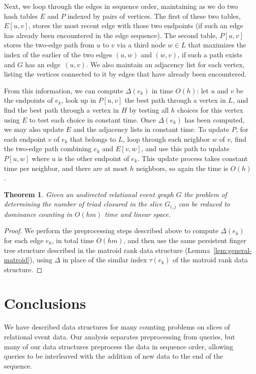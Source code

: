 \documentclass[11pt]{article}
\newtheorem{theorem}{Theorem}
\begin{document}
Next, we loop through the edges in sequence order, maintaining as we do two hash tables $E$ and $P$ indexed by pairs of vertices. The first of these two tables, $E[u,v]$, stores the most recent edge with those two endpoints (if such an edge has already been encountered in the edge sequence). The second table, $P[u,v]$ stores the two-edge path from $u$ to $v$ via a third node $w\in L$ that maximizes the index of the earlier of the two edges $(u,w)$ and $(w,v)$, if  such a path exists and $G$ has an edge~$(u,v)$. We also maintain an adjacency list for each vertex, listing the vertices connected to it by edges that have already been encountered.

From this information, we can compute $\Delta(e_k)$ in time $O(h)$: let $u$ and $v$ be the endpoints of $e_k$, look up in $P[u,v]$ the best path through a vertex in $L$, and find the best path through a vertex in $H$ by testing all $h$ choices for this vertex using $E$ to test each choice in constant time. Once $\Delta(e_k)$ has been computed, we may also update $E$ and the adjacency lists in constant time. To update $P$, for each endpoint $v$ of $e_k$ that belongs to $L$, loop through each neighbor $w$ of $v$, find the two-edge path combining $e_k$ and $E[v,w]$, and use this path to update $P[u,w]$ where $u$ is the other endpoint of $e_k$. This update process takes constant time per neighbor, and there are at most $h$ neighbors, so again the time is $O(h)$.

\begin{theorem}
Given an undirected relational event graph $G$ the problem of determining the number of triad closured in the slice $G_{i,j}$ can be reduced to dominance counting in $O(hm)$ time and linear space.
\end{theorem}
\begin{proof}
We perform the preprocessing steps described above to compute $\Delta(e_k)$ for each edge $e_k$, in total time $O(hm)$, and then use the same persistent finger tree structure described in the matroid rank data structure (Lemma~\ref{lem:general-matroid}), using $\Delta$ in place of the similar index $\tau(e_k)$ of the matroid rank data structure.
\end{proof} 

\section{Conclusions}
We have described data structures for many counting problems on slices of relational event data. Our analysis separates preprocessing from queries,  but many of our data structures preprocess the data in sequence order, allowing queries to be interleaved with the addition of new data to the end of the sequence.
\end{document}
